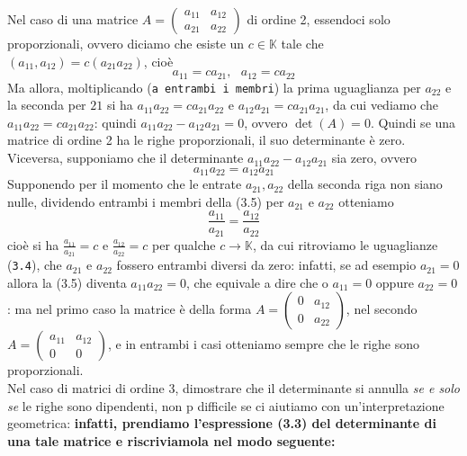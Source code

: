 Nel caso di una matrice $A = \begin{pmatrix} a_{11} & a_{12} \\ a_{21} & a_{22} \end{pmatrix}$ di ordine 2, essendoci solo proporzionali, ovvero diciamo che esiste un $c \in \mathds{K}$ tale che $(a_{11},a_{12})=c(a_{21}a_{22})$, cioè
\begin{equation}
	a_{11}=ca_{21},\text{ }a_{12}=ca_{22}
\end{equation}
Ma allora, moltiplicando ({\tt a entrambi i membri}) la prima uguaglianza per $a_{22}$ e la seconda per $21$ si ha $a_{11}a_{22}=ca_{21}a_{22}$ e $a_{12}a_{21}=ca_{21}a_{21}$, da cui vediamo che $a_{11}a_{22}=ca_{21}a_{22}$: quindi $a_{11}a_{22}-a_{12}a_{21}=0$, ovvero $\det(A)=0$. Quindi se una matrice di ordine 2 ha le righe proporzionali, il suo determinante è zero.\\
Viceversa, supponiamo che il determinante $a_{11}a_{22}-a_{12}a_{21}$ sia zero, ovvero
\begin{equation}
	a_{11}a_{22}=a_{12}a_{21}
\end{equation}
Supponendo per il momento che le entrate $a_{21},a_{22}$ della seconda riga non siano nulle, dividendo entrambi i membri della (3.5) per $a_{21}$ e $a_{22}$  otteniamo
\begin{equation}
	\frac{a_{11}}{a_{21}}=\frac{a_{12}}{a_{22}}
\end{equation}
cioè si ha $\frac{a_{11}}{a_{21}}=c$ e $\frac{a_{12}}{a_{22}}=c$ per qualche $c\to \mathds{K}$, da cui ritroviamo le uguaglianze ({\tt 3.4}), che $a_{21}$ e $a_{22}$ fossero entrambi diversi da zero: infatti, se ad esempio $a_{21}=0$ allora la (3.5) diventa $a_{11}a_{22}=0$, che equivale a dire che o $a_{11}=0$ oppure $a_{22}=0$: ma nel primo caso la matrice è della forma $A=\begin{pmatrix} 0 & a_{12} \\ 0 & a_{22}\end{pmatrix}$, nel secondo $A=\begin{pmatrix} a_{11} & a_{12} \\ 0 & 0\end{pmatrix}$, e in entrambi i casi otteniamo sempre che le righe sono proporzionali.\\
Nel caso di matrici di ordine 3, dimostrare che il determinante si annulla {\em se e solo se} le righe sono dipendenti, non p difficile se ci aiutiamo con un'interpretazione geometrica: {\bf infatti, prendiamo l'espressione (3.3) del determinante di una tale matrice e riscriviamola nel modo seguente:}
